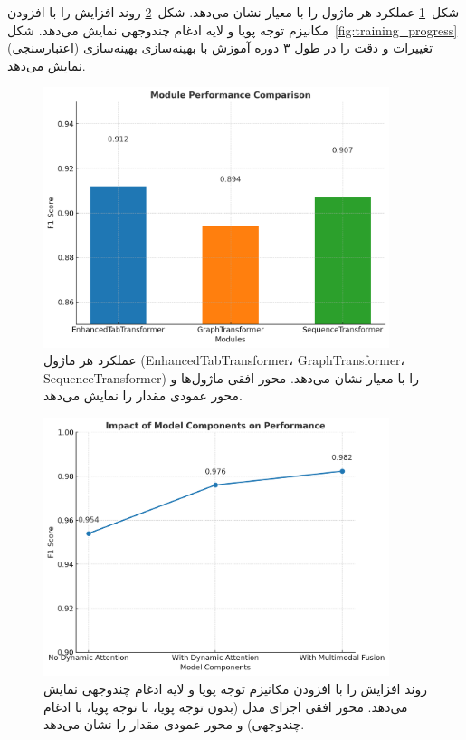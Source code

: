 شکل~\ref{fig:module_comparison} عملکرد هر ماژول را با معیار  نشان می‌دهد. شکل~\ref{fig:ablation_study} روند افزایش  را با افزودن مکانیزم توجه پویا و لایه ادغام چندوجهی نمایش می‌دهد. شکل~\ref{fig:training_progress} تغییرات  و دقت را در طول ۳ دوره آموزش با بهینه‌سازی بهینه‌سازی (اعتبارسنجی) نمایش می‌دهد.

\begin{figure}[h!]
\centering
\includegraphics[width=0.9\textwidth]{images/fig_module_comparison_en}
\caption{عملکرد هر ماژول (EnhancedTabTransformer، GraphTransformer، SequenceTransformer) را با معیار  نشان می‌دهد. محور افقی ماژول‌ها و محور عمودی مقدار  را نمایش می‌دهد.}
\label{fig:module_comparison}
\end{figure}

\begin{figure}[h!]
\centering
\includegraphics[width=0.9\textwidth]{images/fig_ablation_study_en}
\caption{روند افزایش  را با افزودن مکانیزم توجه پویا و لایه ادغام چندوجهی نمایش می‌دهد. محور افقی اجزای مدل (بدون توجه پویا، با توجه پویا، با ادغام چندوجهی) و محور عمودی مقدار  را نشان می‌دهد.}
\label{fig:ablation_study}
\end{figure}

